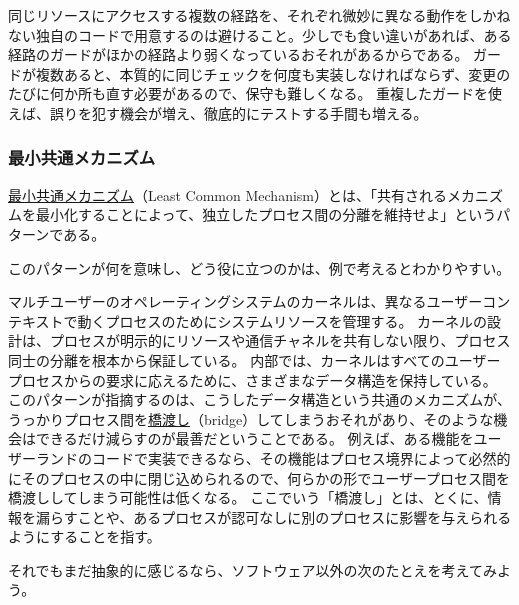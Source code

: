 \documentclass[uplatex]{jsarticle}
\def\label#1{}%
\begin{document}
同じリソースにアクセスする複数の経路を、それぞれ微妙に異なる動作をしかねない独自のコードで用意するのは避けること。少しでも食い違いがあれば、ある経路のガードがほかの経路より弱くなっているおそれがあるからである。
ガードが複数あると、本質的に同じチェックを何度も実装しなければならず、変更のたびに何か所も直す必要があるので、保守も難しくなる。
重複したガードを使えば、誤りを犯す機会が増え、徹底的にテストする手間も増える。

\subsubsection{最小共通メカニズム}

\begin{dfn}[最小共通メカニズム]\label{dfn:ch4-least-common-mechanism}
\underline{最小共通メカニズム}（Least Common Mechanism）とは、「共有されるメカニズムを最小化することによって、独立したプロセス間の分離を維持せよ」というパターンである。
\end{dfn}

このパターンが何を意味し、どう役に立つのかは、例で考えるとわかりやすい。

\begin{exa}\label{exa:ch4-kernel}
マルチユーザーのオペレーティングシステムのカーネルは、異なるユーザーコンテキストで動くプロセスのためにシステムリソースを管理する。
カーネルの設計は、プロセスが明示的にリソースや通信チャネルを共有しない限り、プロセス同士の分離を根本から保証している。
内部では、カーネルはすべてのユーザープロセスからの要求に応えるために、さまざまなデータ構造を保持している。
このパターンが指摘するのは、こうしたデータ構造という共通のメカニズムが、うっかりプロセス間を\underline{橋渡し}（bridge）してしまうおそれがあり、そのような機会はできるだけ減らすのが最善だということである。
例えば、ある機能をユーザーランドのコードで実装できるなら、その機能はプロセス境界によって必然的にそのプロセスの中に閉じ込められるので、何らかの形でユーザープロセス間を橋渡ししてしまう可能性は低くなる。
ここでいう「橋渡し」とは、とくに、情報を漏らすことや、あるプロセスが認可なしに別のプロセスに影響を与えられるようにすることを指す。
\end{exa}

それでもまだ抽象的に感じるなら、ソフトウェア以外の次のたとえを考えてみよう。
\end{document}
